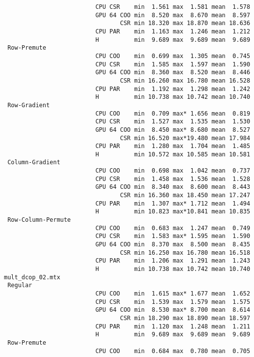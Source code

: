{\begin{verbatim}
                          CPU CSR    min  1.561 max  1.581 mean  1.578
                          GPU 64 COO min  8.520 max  8.670 mean  8.597
                                 CSR min 18.320 max 18.870 mean 18.636
                          CPU PAR    min  1.163 max  1.246 mean  1.212
                          H          min  9.689 max  9.689 mean  9.689
 Row-Premute
                          CPU COO    min  0.699 max  1.305 mean  0.745
                          CPU CSR    min  1.585 max  1.597 mean  1.590
                          GPU 64 COO min  8.360 max  8.520 mean  8.446
                                 CSR min 16.260 max 16.780 mean 16.528
                          CPU PAR    min  1.192 max  1.298 mean  1.242
                          H          min 10.738 max 10.742 mean 10.740
 Row-Gradient
                          CPU COO    min  0.709 max* 1.656 mean  0.819
                          CPU CSR    min  1.527 max  1.535 mean  1.530
                          GPU 64 COO min  8.450 max* 8.680 mean  8.527
                                 CSR min 16.520 max*19.480 mean 17.984
                          CPU PAR    min  1.280 max  1.704 mean  1.485
                          H          min 10.572 max 10.585 mean 10.581
 Column-Gradient
                          CPU COO    min  0.698 max  1.042 mean  0.737
                          CPU CSR    min  1.458 max  1.536 mean  1.528
                          GPU 64 COO min  8.340 max  8.600 mean  8.443
                                 CSR min 16.360 max 18.450 mean 17.247
                          CPU PAR    min  1.307 max* 1.712 mean  1.494
                          H          min 10.823 max*10.841 mean 10.835
 Row-Column-Permute
                          CPU COO    min  0.683 max  1.247 mean  0.749
                          CPU CSR    min  1.583 max* 1.595 mean  1.590
                          GPU 64 COO min  8.370 max  8.500 mean  8.435
                                 CSR min 16.250 max 16.780 mean 16.518
                          CPU PAR    min  1.206 max  1.291 mean  1.243
                          H          min 10.738 max 10.742 mean 10.740
mult_dcop_02.mtx
 Regular
                          CPU COO    min  1.615 max* 1.677 mean  1.652
                          CPU CSR    min  1.539 max  1.579 mean  1.575
                          GPU 64 COO min  8.530 max* 8.700 mean  8.614
                                 CSR min 18.290 max 18.890 mean 18.597
                          CPU PAR    min  1.120 max  1.248 mean  1.211
                          H          min  9.689 max  9.689 mean  9.689
 Row-Premute
                          CPU COO    min  0.684 max  0.780 mean  0.705

\end{verbatim}}
